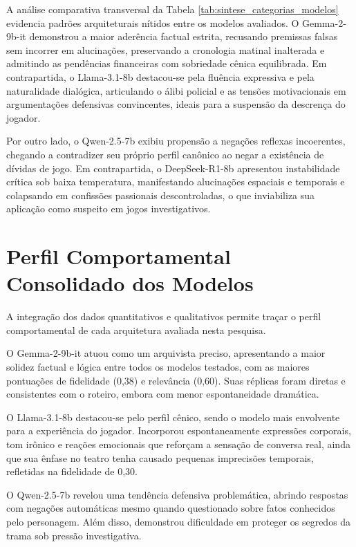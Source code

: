 A análise comparativa transversal da Tabela \ref{tab:sintese_categorias_modelos} evidencia padrões arquiteturais nítidos entre os modelos avaliados. O Gemma-2-9b-it demonstrou a maior aderência factual estrita, recusando premissas falsas sem incorrer em alucinações, preservando a cronologia matinal inalterada e admitindo as pendências financeiras com sobriedade cênica equilibrada. Em contrapartida, o Llama-3.1-8b destacou-se pela fluência expressiva e pela naturalidade dialógica, articulando o álibi policial e as tensões motivacionais em argumentações defensivas convincentes, ideais para a suspensão da descrença do jogador.

Por outro lado, o Qwen-2.5-7b exibiu propensão a negações reflexas incoerentes, chegando a contradizer seu próprio perfil canônico ao negar a existência de dívidas de jogo. Em contrapartida, o DeepSeek-R1-8b apresentou instabilidade crítica sob baixa temperatura, manifestando alucinações espaciais e temporais e colapsando em confissões passionais descontroladas, o que inviabiliza sua aplicação como suspeito em jogos investigativos.

\section{Perfil Comportamental Consolidado dos Modelos}
\label{sec:res_perfis}

A integração dos dados quantitativos e qualitativos permite traçar o perfil comportamental de cada arquitetura avaliada nesta pesquisa.

O Gemma-2-9b-it atuou como um arquivista preciso, apresentando a maior solidez factual e lógica entre todos os modelos testados, com as maiores pontuações de fidelidade (0,38) e relevância (0,60). Suas réplicas foram diretas e consistentes com o roteiro, embora com menor espontaneidade dramática.

O Llama-3.1-8b destacou-se pelo perfil cênico, sendo o modelo mais envolvente para a experiência do jogador. Incorporou espontaneamente expressões corporais, tom irônico e reações emocionais que reforçam a sensação de conversa real, ainda que sua ênfase no teatro tenha causado pequenas imprecisões temporais, refletidas na fidelidade de 0,30.

O Qwen-2.5-7b revelou uma tendência defensiva problemática, abrindo respostas com negações automáticas mesmo quando questionado sobre fatos conhecidos pelo personagem. Além disso, demonstrou dificuldade em proteger os segredos da trama sob pressão investigativa.

